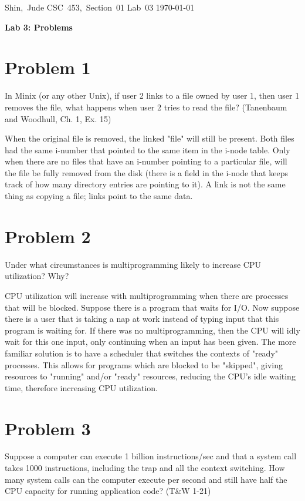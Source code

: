 \documentclass[11pt]{article}
\begin{document}
\hfill\vbox{\hbox{Shin, Jude}
		\hbox{CSC 453, Section 01}	
		\hbox{Lab 03}	
		\hbox{\today}}\par

\bigskip
\centerline{\Large\bf Lab 3: Problems}\par
\bigskip

\section*{Problem 1}
In Minix (or any other Unix), if user 2 links to a file owned by user 1, then user 1 removes the file, what happens when user 2 tries to read the file? (Tanenbaum and Woodhull, Ch. 1, Ex. 15)


When the original file is removed, the linked "file" will still be present. Both files had the same i-number that pointed to the same item in the i-node table. Only when there are no files that have an i-number pointing to a particular file, will the file be fully removed from the disk (there is a field in the i-node that keeps track of how many directory entries are pointing to it). A link is not the same thing as copying a file; links point to the same data. 


\section*{Problem 2}
Under what circumstances is multiprogramming likely to increase CPU utilization? Why?

CPU utilization will increase with multiprogramming when there are processes that will be blocked. Suppose there is a program that waits for I/O. Now suppose there is a user that is taking a nap at work instead of typing input that this program is waiting for. If there was no multiprogramming, then the CPU will idly wait for this one input, only continuing when an input has been given. The more familiar solution is to have a scheduler that switches the contexts of "ready" processes. This allows for programs which are blocked to be "skipped", giving resources to "running" and/or "ready" resources, reducing the CPU's idle waiting time, therefore increasing CPU utilization.


\section*{Problem 3}
Suppose a computer can execute 1 billion instructions/sec and that a system call takes 1000 instructions, including the trap and all the context switching. How many system calls can the computer execute per second and still have half the CPU capacity for running application code? (T\&W 1-21)
\end{document}
